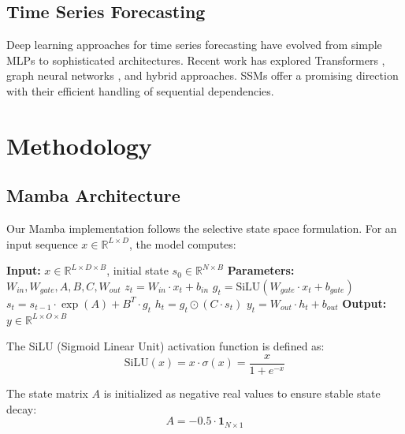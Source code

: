 \documentclass[11pt,a4paper]{article}
\begin{document}
\subsection{Time Series Forecasting}

Deep learning approaches for time series forecasting have evolved from simple MLPs to sophisticated architectures. Recent work has explored Transformers \cite{zhou2021informer}, graph neural networks \cite{wu2020connecting}, and hybrid approaches. SSMs offer a promising direction with their efficient handling of sequential dependencies.

\section{Methodology}

\subsection{Mamba Architecture}

Our Mamba implementation follows the selective state space formulation. For an input sequence $x \in \mathbb{R}^{L \times D}$, the model computes:

\begin{algorithm}[H]
\caption{Mamba Forward Pass}
\begin{algorithmic}[1]
\STATE \textbf{Input:} $x \in \mathbb{R}^{L \times D \times B}$, initial state $s_0 \in \mathbb{R}^{N \times B}$
\STATE \textbf{Parameters:} $W_{in}, W_{gate}, A, B, C, W_{out}$
    \STATE $z_t = W_{in} \cdot x_t + b_{in}$ 
    \STATE $g_t = \text{SiLU}(W_{gate} \cdot x_t + b_{gate})$ 
    \STATE $s_t = s_{t-1} \cdot \exp(A) + B^T \cdot g_t$ 
    \STATE $h_t = g_t \odot (C \cdot s_t)$ 
    \STATE $y_t = W_{out} \cdot h_t + b_{out}$ 
\ENDFOR
\STATE \textbf{Output:} $y \in \mathbb{R}^{L \times O \times B}$
\end{algorithmic}
\end{algorithm}

The SiLU (Sigmoid Linear Unit) activation function is defined as:
\begin{equation}
    \text{SiLU}(x) = x \cdot \sigma(x) = \frac{x}{1 + e^{-x}}
\end{equation}

The state matrix $A$ is initialized as negative real values to ensure stable state decay:
\begin{equation}
    A = -0.5 \cdot \mathbf{1}_{N \times 1}
\end{equation}
\end{document}
